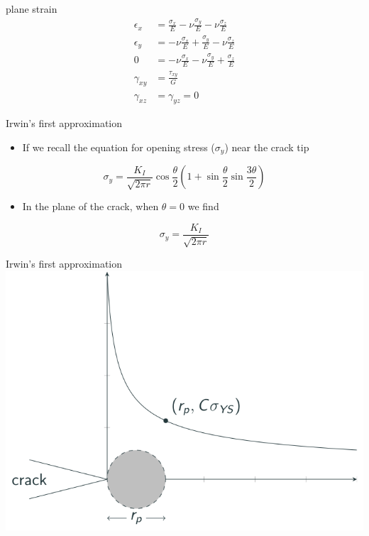 \documentclass[
  letterpaper,
  ignorenonframetext,
  aspectratio=43,
  handout,
  12pt]{beamer}
\providecommand{\tightlist}{%
  \setlength{\itemsep}{0pt}\setlength{\parskip}{0pt}}
\providecommand{\tightlist}{%
\setlength{\itemsep}{0pt}\setlength{\parskip}{0pt}}
\let\Oldincludegraphics\includegraphics
\renewcommand{\includegraphics}[2][]{\Oldincludegraphics[width=\textwidth,height=0.7\textheight,keepaspectratio]{#2}}
\begin{document}
\begin{frame}{plane strain}
\protect\hypertarget{plane-strain}{}
\[\begin{aligned}
  \epsilon_x &= \frac{\sigma_x}{E} - \nu \frac{\sigma_y}{E} - \nu \frac{\sigma_z}{E}\\
  \epsilon_y &= -\nu \frac{\sigma_x}{E} + \frac{\sigma_y}{E} - \nu \frac{\sigma_z}{E}\\
  0 &= -\nu \frac{\sigma_x}{E} - \nu \frac{\sigma_y}{E} + \frac{\sigma_z}{E}\\
  \gamma_{xy} &= \frac{\tau_{xy}}{G}\\
  \gamma_{xz} &= \gamma_{yz} = 0
\end{aligned}\]
\end{frame}

\begin{frame}{Irwin's first approximation}
\protect\hypertarget{irwins-first-approximation}{}
\begin{itemize}
\tightlist
\item
  If we recall the equation for opening stress (\(\sigma_y\)) near the
  crack tip
\end{itemize}

\[\sigma_y = \frac{K_I}{\sqrt{2\pi r}} \cos \frac{\theta}{2} \left(1+\sin \frac{\theta}{2}\sin \frac{3\theta}{2}\right) \tag{1.2}\]

\begin{itemize}
\tightlist
\item
  In the plane of the crack, when \(\theta=0\) we find
\end{itemize}

\[\sigma_y = \frac{K_I}{\sqrt{2\pi r}}\]
\end{frame}

\begin{frame}{Irwin's first approximation}
\protect\hypertarget{irwins-first-approximation-1}{}
\includegraphics{../images/plastic-zone.svg}
\end{frame}
\end{document}
